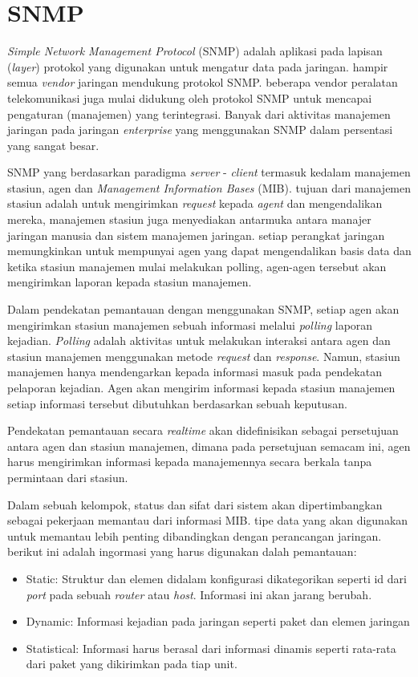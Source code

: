 		\section{SNMP}
			\textit{Simple Network Management Protocol} (SNMP) adalah aplikasi pada lapisan (\textit{layer}) protokol yang digunakan untuk mengatur data pada jaringan. hampir semua \textit{vendor} jaringan mendukung protokol SNMP. beberapa vendor peralatan telekomunikasi juga mulai didukung oleh protokol SNMP untuk mencapai pengaturan (manajemen) yang terintegrasi. Banyak dari aktivitas manajemen jaringan pada jaringan \textit{enterprise} yang menggunakan SNMP dalam persentasi yang sangat besar.
			
			SNMP yang berdasarkan paradigma \textit{server} - \textit{client} termasuk kedalam manajemen stasiun, agen dan \textit{Management Information Bases} (MIB). tujuan dari manajemen stasiun adalah untuk mengirimkan \textit{request} kepada \textit{agent} dan mengendalikan mereka, manajemen stasiun juga menyediakan antarmuka antara manajer jaringan manusia dan sistem manajemen jaringan. setiap perangkat jaringan memungkinkan untuk mempunyai agen yang dapat mengendalikan basis data dan ketika stasiun manajemen mulai melakukan polling, agen-agen tersebut akan mengirimkan laporan kepada stasiun manajemen.
			
			Dalam pendekatan pemantauan dengan menggunakan SNMP, setiap agen akan mengirimkan stasiun manajemen sebuah informasi melalui \textit{polling} laporan kejadian. \textit{Polling} adalah aktivitas untuk melakukan interaksi antara agen dan stasiun manajemen menggunakan metode \textit{request} dan \textit{response}. Namun, stasiun manajemen hanya mendengarkan kepada informasi masuk pada pendekatan pelaporan kejadian. Agen akan mengirim informasi kepada stasiun manajemen setiap informasi tersebut dibutuhkan berdasarkan sebuah keputusan.
			
			Pendekatan pemantauan secara \textit{realtime} akan didefinisikan sebagai persetujuan antara agen dan stasiun manajemen, dimana pada persetujuan semacam ini, agen harus mengirimkan informasi kepada manajemennya secara berkala tanpa permintaan dari stasiun.
			
			Dalam sebuah kelompok, status dan sifat dari sistem akan dipertimbangkan sebagai pekerjaan memantau dari informasi MIB. tipe data yang akan digunakan untuk memantau lebih penting dibandingkan dengan perancangan jaringan. berikut ini adalah ingormasi yang harus digunakan dalah pemantauan:
			\begin{itemize}
				\item Static: Struktur dan elemen didalam konfigurasi dikategorikan seperti id dari \textit{port} pada sebuah \textit{router} atau \textit{host}. Informasi ini akan jarang berubah.
				\item Dynamic: Informasi kejadian pada jaringan seperti paket dan elemen jaringan
				\item Statistical: Informasi harus berasal dari informasi dinamis seperti rata-rata dari paket yang dikirimkan pada tiap unit.
			\end{itemize}

